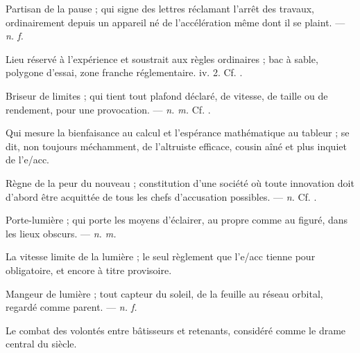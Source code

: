  Partisan de la pause ; qui signe des lettres réclamant l'arrêt des travaux, ordinairement depuis un appareil né de l'accélération même dont il se plaint. ---  \textit{n. f.}

 Lieu réservé à l'expérience et soustrait aux règles ordinaires ; bac à sable, polygone d'essai, zone franche réglementaire.   iv. 2. Cf. .

 Briseur de limites ; qui tient tout plafond déclaré, de vitesse, de taille ou de rendement, pour une provocation. ---  \textit{n. m.} Cf. .

 Qui mesure la bienfaisance au calcul et l'espérance mathématique au tableur ; se dit, non toujours méchamment, de l'altruiste efficace, cousin aîné et plus inquiet de l'e/acc.

 Règne de la peur du nouveau ; constitution d'une société où toute innovation doit d'abord être acquittée de tous les chefs d'accusation possibles. ---  \textit{n.} Cf. .

 Porte-lumière ; qui porte les moyens d'éclairer, au propre comme au figuré, dans les lieux obscurs. ---  \textit{n. m.}

 La vitesse limite de la lumière ; le seul règlement que l'e/acc tienne pour obligatoire, et encore à titre provisoire.

 Mangeur de lumière ; tout capteur du soleil, de la feuille au réseau orbital, regardé comme parent.  ---  \textit{n. f.}

 Le combat des volontés entre bâtisseurs et retenants, considéré comme le drame central du siècle.

